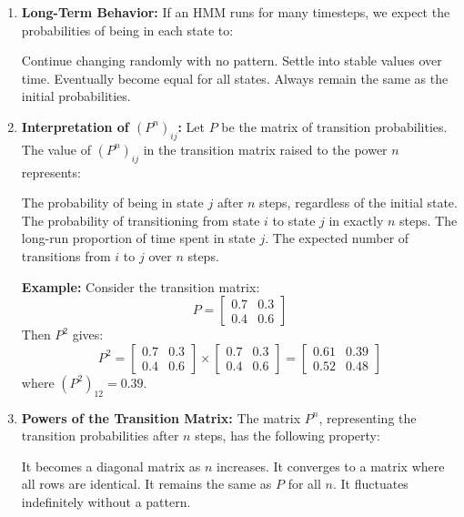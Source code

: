 \documentclass[12pt,letterpaper, onecolumn]{exam}
\begin{document}
\begin{questions}
\begin{enumerate}[label=(\alph*)]
    \item \textbf{Long-Term Behavior:} If an HMM runs for many timesteps, we expect the probabilities of being in each state to:
\begin{choices}
    \choice Continue changing randomly with no pattern.
    \choice Settle into stable values over time.
    \choice Eventually become equal for all states.
    \choice Always remain the same as the initial probabilities.
\end{choices}
    \item \textbf{Interpretation of \( (P^n)_{ij} \):} Let \( P \) be the matrix of transition probabilities. The value of \( (P^n)_{ij} \) in the transition matrix raised to the power \( n \) represents:
\begin{choices}
    \choice The probability of being in state \( j \) after \( n \) steps, regardless of the initial state.
    \choice The probability of transitioning from state \( i \) to state \( j \) in exactly \( n \) steps.
    \choice The long-run proportion of time spent in state \( j \).
    \choice The expected number of transitions from \( i \) to \( j \) over \( n \) steps.
\end{choices}

\textbf{Example:}
Consider the transition matrix:
\[
P =
\begin{bmatrix}
0.7 & 0.3 \\
0.4 & 0.6
\end{bmatrix}
\]
Then \( P^2 \) gives:
\[
P^2 =
\begin{bmatrix}
0.7 & 0.3 \\
0.4 & 0.6
\end{bmatrix}
\times
\begin{bmatrix}
0.7 & 0.3 \\
0.4 & 0.6
\end{bmatrix}
=
\begin{bmatrix}
0.61 & 0.39 \\
0.52 & 0.48
\end{bmatrix}
\]
where \( (P^2)_{12} = 0.39 \).

\item \textbf{Powers of the Transition Matrix:} The matrix \( P^n \), representing the transition probabilities after \( n \) steps, has the following property:
\begin{choices}
    \choice It becomes a diagonal matrix as \( n \) increases.
    \choice It converges to a matrix where all rows are identical.
    \choice It remains the same as \( P \) for all \( n \).
    \choice It fluctuates indefinitely without a pattern.
\end{choices}


\end{enumerate}
\end{questions}
\end{document}
